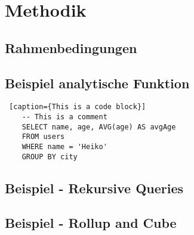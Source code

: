 \chapter{Methodik}

\section{Rahmenbedingungen}

\section{Beispiel analytische Funktion}

\begin{lstlisting} [caption={This is a code block}]
    -- This is a comment
    SELECT name, age, AVG(age) AS avgAge
    FROM users
    WHERE name = 'Heiko'
    GROUP BY city
\end{lstlisting}

\section{Beispiel - Rekursive Queries}

\section{Beispiel - Rollup and Cube}